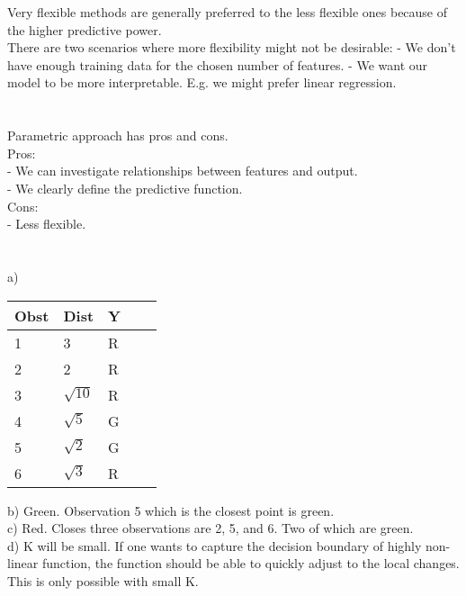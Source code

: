 \documentclass{article}
\begin{document}
Very flexible methods are generally preferred to the less flexible ones because of the higher
predictive power. \\

There are two scenarios where more flexibility might not be desirable:
 - We don't have enough training data for the chosen number of features.
 - We want our model to be more interpretable. E.g. we might prefer linear regression.
 
\section{}

Parametric approach has pros and cons. \\

Pros: \\
 - We can investigate relationships between features and output. \\
 - We clearly define the predictive function. \\

Cons: \\
 - Less flexible. \\

\section{}

a)

\begin{table}[h]
\begin{tabular}{lllll}
Obst & Dist & Y \\
\hline
1 & 3 & R \\
2 & 2 & R \\
3 & $\sqrt{10}$ & R \\
4 & $\sqrt{5}$ & G \\
5 & $\sqrt{2}$ & G \\
6 & $\sqrt{3}$ & R \\
\end{tabular}
\end{table}

b) Green. Observation 5 which is the closest point is green. \\

c) Red. Closes three observations are 2, 5, and 6. Two of which are green. \\

d) K will be small. If one wants to capture the decision boundary of highly non-linear function, the function should be able to quickly adjust to the local changes. This is only possible with small K. \\
\end{document}
